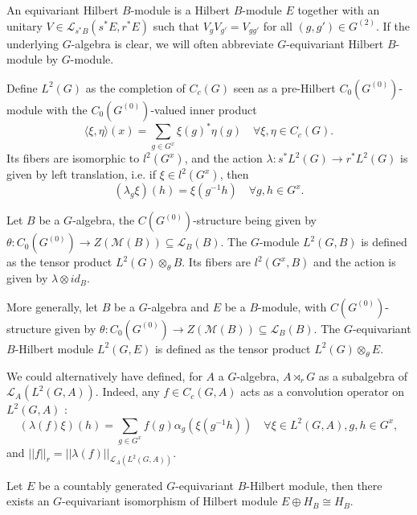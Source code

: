 \begin{definition}
An equivariant Hilbert $B$-module is a Hilbert $B$-module $E$ together with an unitary $V\in\mathcal L_{s^* B}(s^*E ,r^* E)$ such that $V_gV_{g'} = V_{gg'}$ for all $(g,g')\in G^{(2)}$. If the underlying $G$-algebra is clear, we will often abbreviate $G$-equivariant Hilbert $B$-module by $G$-module.
\end{definition}

\begin{Expl} Define $L^2(G)$ as the completion of $C_c(G)$ seen as a pre-Hilbert $C_0(G^{(0)})$-module with the $C_0(G^{(0)})$-valued inner product 
\[\langle \xi ,\eta\rangle (x) = \sum_{g\in G^x} \xi(g)^*\eta(g) \quad \forall \xi,\eta\in C_c(G).\]
Its fibers are isomorphic to $l^2(G^x)$, and the action $\lambda : s^*L^2(G) \rightarrow r^* L^2(G)$ is given by left translation, i.e. if $\xi\in l^2(G^x)$, then
\[(\lambda_g\xi)(h) = \xi(g^{-1}h)\quad \forall g,h\in G^x.\]
\end{Expl}

\begin{Expl} Let $B$ be a $G$-algebra, the $C(G^{(0)})$-structure being given by $\theta : C_0(G^{(0)})\rightarrow Z(\mathcal M(B))\subseteq \mathcal L_B(B)$. The $G$-module $L^2(G,B)$ is defined as the tensor product $ L^2(G)\otimes_\theta B$. Its fibers are $l^2(G^x,B)$ and the action is given by $\lambda\otimes id_{B}$.
\end{Expl}

\begin{Expl} More generally, let $B$ be a $G$-algebra and $E$ be a $B$-module, with $C(G^{(0)})$-structure given by $\theta : C_0(G^{(0)})\rightarrow Z(\mathcal M(B))\subseteq \mathcal L_B(B)$. The $G$-equivariant $B$-Hilbert module $L^2(G,E)$ is defined as the tensor product $ L^2(G)\otimes_\theta E$.
\end{Expl}

\begin{rk}
We could alternatively have defined, for $A$ a $G$-algebra, $A\rtimes_r G$ as a subalgebra of $\mathcal L_A(L^2(G,A))$. Indeed, any $f\in C_c(G,A)$ acts as a convolution operator on $L^2(G,A)$ :
\[(\lambda(f)\xi)(h) = \sum_{g\in G^x} f(g)\alpha_g(\xi(g^{-1} h))\quad \forall \xi\in L^2(G,A),g,h\in G^x,\]
and $||f||_{r} = ||\lambda(f)||_{\mathcal L_A (L^2(G,A))}$.
\end{rk}

\begin{lem} \label{GStabilization} Let $E$ be a countably generated $G$-equivariant $B$-Hilbert module, then there exists an $G$-equivariant isomorphism of Hilbert module $E \oplus H_B \cong H_B$.
\end{lem}

